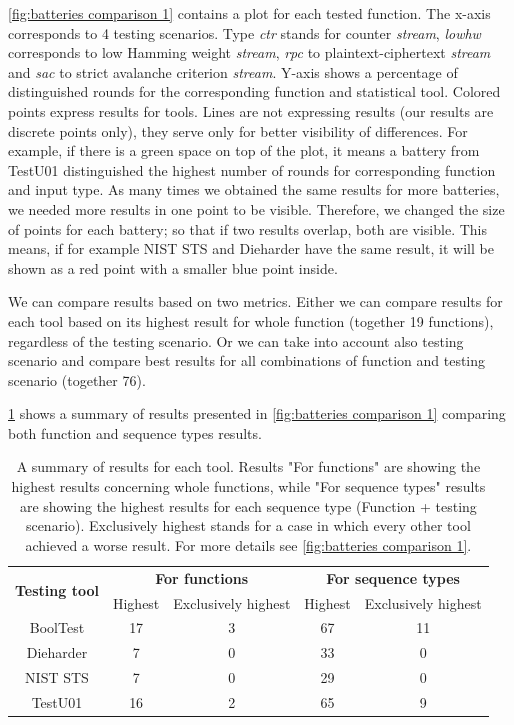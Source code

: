 \documentclass[
    digital,    %
    oneside,    %
    color,
    11pt,
    nocover,
    notable,
    nolof,
    nolot,
    final
]{fithesis3}
\renewcommand\_{\textunderscore\allowbreak}
\begin{document}
\cref{fig:batteries comparison 1} contains a plot for each tested function. The x-axis corresponds to 4 testing scenarios. Type \textit{ctr} stands for counter \textit{stream}, \textit{lowhw} corresponds to low Hamming weight \textit{stream}, \textit{rpc} to plaintext-ciphertext \textit{stream} and \textit{sac} to strict avalanche criterion \textit{stream}. Y-axis shows a percentage of distinguished rounds for the corresponding function and statistical tool. Colored points express results for tools. Lines are not expressing results (our results are discrete points only), they serve only for better visibility of differences. For example, if there is a green space on top of the plot, it means a battery from TestU01 distinguished the highest number of rounds for corresponding function and input type. As many times we obtained the same results for more batteries, we needed more results in one point to be visible. Therefore, we changed the size of points for each battery; so that if two results overlap, both are visible. This means, if for example NIST STS and Dieharder have the same result, it will be shown as a red point with a smaller blue point inside. 

We can compare results based on two metrics. Either we can compare results for each tool based on its highest result for whole function (together 19 functions), regardless of the testing scenario. Or we can take into account also testing scenario and compare best results for all combinations of function and testing scenario (together 76).

\cref{table:baterries_results} shows a summary of results presented in \cref{fig:batteries comparison 1} comparing both function and sequence types results.

\begin{table}[htbp]
	\centering
	\begin{tabular}{|c|c|c|c|c|}
		\hline
		\multirow{2}{*}{\textbf{\large Testing tool}} & \multicolumn{2}{c|}{\textbf{\large For functions}} & \multicolumn{2}{c|}{\textbf{\large For sequence types}} \\ \cline{2-5}
		& Highest & Exclusively highest & Highest & Exclusively highest \\ \hline
		BoolTest & 17 & 3 & 67 & 11 \\
		Dieharder & 7 & 0 & 33 & 0 \\
		NIST STS & 7 & 0 & 29 & 0 \\
		TestU01 & 16 & 2 &  65 & 9 \\ \hline
		
	\end{tabular}
	\caption{A summary of results for each tool. Results "For functions" are showing the highest results concerning whole functions, while "For sequence types" results are showing the highest results for each sequence type (Function + testing scenario). Exclusively highest stands for a case in which every other tool achieved a worse result. For more details see \cref{fig:batteries comparison 1}.}
	\label{table:baterries_results}
\end{table}
\end{document}
